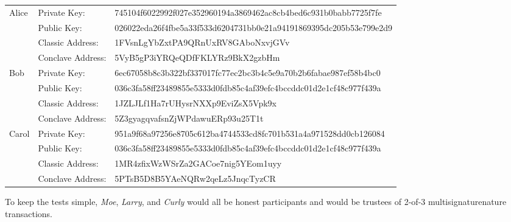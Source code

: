 \documentclass{report}
\begin{document}
			\bgroup
			\small
			\def\arraystretch{1.5}
			\begin{tabular}{|l|l|l|}
				\hline
				\multirow{4}{*}{Alice} & Private Key: & 745104f6022992f027e352960194a3869462ac8cb4bed6c931b0babb7725f7fe \\ \cline{2-3} 
		                   & Public Key:  & 026022eda26f4fbe5a33f533d6204731bb0e21a94191869395dc205b53e799e2d9 \\ \cline{2-3} 
		                   & Classic Address:     & 1FVsnLgYbZxtPA9QRnUxRV8GAboNxvjGVv \\ \cline{2-3}
		                   & Conclave Address:     & 5VyB5gP3iYRQeQDfFKLYRz9BkX2gzbHm \\ \hline
				\multirow{4}{*}{Bob} & Private Key: & 6ec67058b8c3b322bf337017fc77ec2bc3b4c5e9a70b2b6fabae987ef58b4bc0 \\ \cline{2-3} 
		                   & Public Key:  & 036c3fa58ff23489855e5333d0fdb85c4af39efc4bccddc01d2e1cf48c977f439a \\ \cline{2-3} 
		                   & Classic Address:     & 1JZLJLf1Ha7rUHysrNXXp9EviZsX5Vpk9x \\ \cline{2-3}
		                   & Conclave Address:     & 5Z3gyagqvafsnZjWPdawuERp93u25T1t \\ \hline
				\multirow{4}{*}{Carol} & Private Key: & 951a9f68a97256e8705c612ba4744533cd8fc701b531a4a971528dd0cb126084 \\ \cline{2-3} 
		                   & Public Key:  & 036c3fa58ff23489855e5333d0fdb85c4af39efc4bccddc01d2e1cf48c977f439a \\ \cline{2-3} 
		                   & Classic Address:     & 1MR4zfixWzWSrZa2GACoe7nig5YEom1uyy \\ \cline{2-3}
		                   & Conclave Address:     & 5PTsB5D8B5YAeNQRw2qeLz5JnqcTyzCR \\ \hline
			\end{tabular}
			\egroup
			\normalsize
			\bigbreak
			To keep the tests simple, \textit{Moe}, \textit{Larry}, and \textit{Curly} would all be honest participants and would be trustees of 2-of-3 multisignaturenature transactions.
\end{document}
